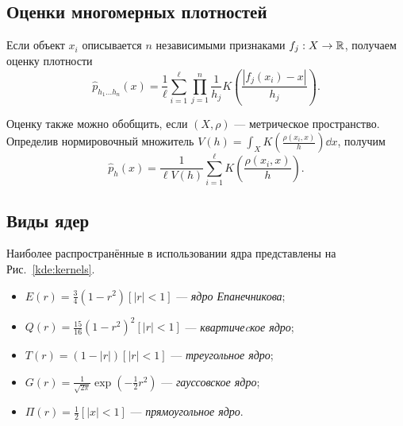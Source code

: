 \subsection*{Оценки многомерных плотностей}
Если объект $x_i$ описывается $n$ независимыми признаками $f_j: X \to \mathbb{R}$,
получаем оценку плотности
\begin{equation}
\hat{p}_{h_1 \ldots h_n}(x)
  = \frac{1}{\ell}\sum_{i = 1}^\ell
    \prod_{j = 1}^n \frac{1}{h_j} K\left(\frac{|f_j(x_i) - x|}{h_j}\right).
\label{kde:features}
\end{equation}

Оценку также можно обобщить, если $ (X, \rho) $ --- метрическое пространство.
Определив нормировочный множитель
$V(h) = \int_X K\left(\frac{\rho(x_i, x)}{h}\right) \dd{x}$, получим
\begin{equation}
\hat{p}_h(x)
  = \frac{1}{\ell V(h)}\sum_{i = 1}^\ell K\left(\frac{\rho(x_i, x)}{h}\right).
\label{kde:metric}
\end{equation}
\subsection*{Виды ядер}

Наиболее распространённые в использовании ядра представлены на Рис.~\ref{kde:kernels}.
\begin{itemize}
\item $E(r) = \frac{3}{4}(1 - r^2)[|r| < 1]$ --- \emph{ядро Епанечникова};
\item $Q(r) = \frac{15}{16}(1 - r^2)^2 [|r| < 1]$ --- \emph{квартичеcкое ядро};
\item $T(r) = (1 - |r|) [|r| < 1]$ --- \emph{треугольное ядро};
\item $G(r) = \frac{1}{\sqrt{2\pi}} \exp(-\frac{1}{2} r^2)$ --- \emph{гауссовское ядро};
\item $\Pi(r) = \frac{1}{2} [|x| < 1]$ --- \emph{прямоугольное ядро}.
\end{itemize}

